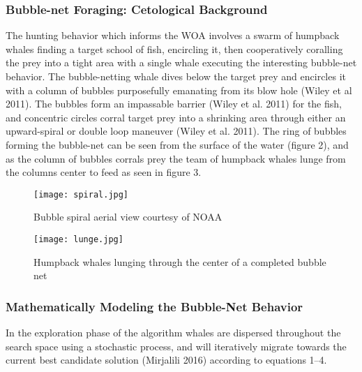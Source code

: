 \documentclass[11pt]{article}
\begin{document}
\subsubsection*{Bubble-net Foraging: Cetological Background}
The hunting behavior which informs the WOA involves a swarm of humpback whales finding a target school of fish, encircling it, then cooperatively coralling the prey into a tight area with a single whale executing the interesting bubble-net behavior.
The bubble-netting whale dives below the target prey and encircles it with a column of bubbles purposefully emanating from its blow hole (Wiley et al 2011).
The bubbles form an impassable barrier (Wiley et al. 2011) for the fish, and concentric circles corral target prey into a shrinking area through either an upward-spiral or double loop maneuver (Wiley et al. 2011).
The ring of bubbles forming the bubble-net can be seen from the surface of the water (figure 2), and as the column of bubbles corrals prey the team of humpback whales lunge from the columns center to feed as seen in figure 3.


	\begin{figure}[h]
		\centering
		\caption{Bubble spiral aerial view courtesy of NOAA}
		\texttt{[image: spiral.jpg]}
	\end{figure}
	\begin{figure}[H]
		\centering
		\caption{Humpback whales lunging through the center of a completed bubble net}
		\texttt{[image: lunge.jpg]}
	\end{figure}


\subsubsection*{Mathematically Modeling the Bubble-Net Behavior}
In the exploration phase of the algorithm whales are dispersed throughout the search space using a stochastic process, and will iteratively migrate towards the current best candidate solution (Mirjalili 2016) according to equations 1--4.
\end{document}
